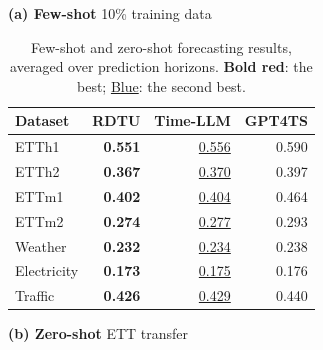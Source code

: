 \begin{table}[t]
\centering
\begingroup

\renewcommand{\boldres}[1]{\textcolor{fzBest}{\textbf{#1}}}
\renewcommand{\secondres}[1]{\textcolor{fzSecond}{\underline{#1}}}

\setlength{\tabcolsep}{4pt}
\setlength{\heavyrulewidth}{0.7pt}
\setlength{\lightrulewidth}{0.35pt}
\renewcommand{\arraystretch}{1.12}

\caption{Few-shot and zero-shot forecasting results, averaged over prediction horizons.
\boldres{Bold red}: the best; \secondres{Blue}: the second best.}
\label{tab:few-zero-shot-combined}
\label{tab:few-shot-forecasting-10per-brief}
\label{tab:zero-shot-forecasting-brief}

\small
\vspace{-9pt}

\begin{minipage}[t]{0.48\textwidth}
\vspace{0pt}
\noindent\strut\textbf{(a) Few-shot}\hfill
\textcolor{black!65}{10\% training data}\par
\vspace{4pt}

\centering
\begin{tabular*}{\linewidth}{@{\extracolsep{\fill}}lrrr@{}}
\toprule
\textbf{Dataset}
  & \textbf{RDTU}
  & \textbf{Time-LLM}
  & \textbf{GPT4TS} \\
\midrule
ETTh1       & \boldres{0.551} & \secondres{0.556} & 0.590 \\
ETTh2       & \boldres{0.367} & \secondres{0.370} & 0.397 \\
ETTm1       & \boldres{0.402} & \secondres{0.404} & 0.464 \\
ETTm2       & \boldres{0.274} & \secondres{0.277} & 0.293 \\
\addlinespace[2pt]
Weather     & \boldres{0.232} & \secondres{0.234} & 0.238 \\
Electricity & \boldres{0.173} & \secondres{0.175} & 0.176 \\
Traffic     & \boldres{0.426} & \secondres{0.429} & 0.440 \\
\bottomrule
\end{tabular*}
\end{minipage}%
\hfill
\begin{minipage}[t]{0.48\textwidth}
\vspace{0pt}
\noindent\strut\textbf{(b) Zero-shot}\hfill
\textcolor{black!65}{ETT transfer}\par
\vspace{4pt}


\end{minipage}
\end{table}
